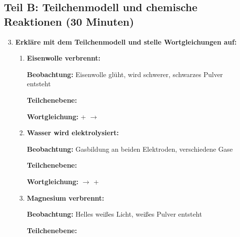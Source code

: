 \subsection*{Teil B: Teilchenmodell und chemische Reaktionen (30 Minuten)}

\begin{enumerate}[label=\arabic*.]
    \setcounter{enumi}{2}

    \item \textbf{Erkläre mit dem Teilchenmodell und stelle Wortgleichungen auf:}
    \vspace{0.5cm}

    \begin{enumerate}[label=\alph*)]
        \item \textbf{Eisenwolle verbrennt:}

        \textbf{Beobachtung:} Eisenwolle glüht, wird schwerer, schwarzes Pulver entsteht

        \textbf{Teilchenebene:} \underline{\hspace{8cm}}
        \vspace{1cm}

        \textbf{Wortgleichung:} \underline{\hspace{3cm}} + \underline{\hspace{3cm}} $\rightarrow$ \underline{\hspace{3cm}}
        \vspace{1cm}

        \item \textbf{Wasser wird elektrolysiert:}

        \textbf{Beobachtung:} Gasbildung an beiden Elektroden, verschiedene Gase

        \textbf{Teilchenebene:} \underline{\hspace{8cm}}
        \vspace{1cm}

        \textbf{Wortgleichung:} \underline{\hspace{3cm}} $\rightarrow$ \underline{\hspace{3cm}} + \underline{\hspace{3cm}}
        \vspace{1cm}

        \item \textbf{Magnesium verbrennt:}

        \textbf{Beobachtung:} Helles weißes Licht, weißes Pulver entsteht

        \textbf{Teilchenebene:} \underline{\hspace{8cm}}
        \vspace{1cm}


\end{enumerate}
\end{enumerate}

